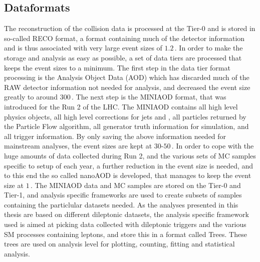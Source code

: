 \subsection*{Dataformats}
\noindent\justify
The reconstruction of the collision data is processed at the Tier-0 and is stored in so-called RECO format, a format containing much of the detector information and is thus associated with very large event sizes of $1.2\,$\MB.
In order to make the storage and analysis as easy as possible, a set of data tiers are processed that keeps the event sizes to a minimum.
The first step in the data tier format processing is the Analysis Object Data (AOD) which has discarded much of the RAW detector information not needed for analysis, and decreased the event size greatly to around $300\,$\kB.
The next step is the MINIAOD format, that was introduced for the Run 2 of the LHC.
The MINIAOD contains all high level physics objects, all high level corrections for jets and \ptmiss, all particles returned by the Particle Flow algorithm, all generator truth information for simulation, and all trigger information.
By only saving the above information needed for mainstream analyses, the event sizes are kept at $30$-$50\,$\kB.
In order to cope with the huge amounts of data collected during Run 2, and the various sets of MC samples specific to setup of each year, a further reduction in the event size is needed, and to this end the so called nanoAOD is developed, that manages to keep the event size at $1\,$\kB.
The MINIAOD data and MC samples are stored on the Tier-0 and Tier-1, and analysis specific frameworks are used to create subsets of samples containing the particlular datasets needed.
As the analyses presented in this thesis are based on different dileptonic datasets, the analysis specific framework used is aimed at picking data collected with dileptonic triggers and the various SM processes containing leptons, and store this in a format called Trees.
These trees are used on analysis level for plotting, counting, fitting and statistical analysis.
